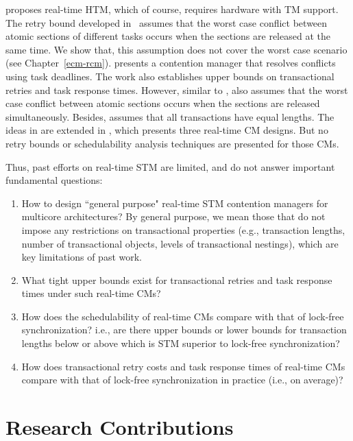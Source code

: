 \cite{schoeberl2010rttm} proposes real-time HTM, which of course, requires hardware with TM support. The retry bound developed in~\cite{schoeberl2010rttm} assumes that the worst case conflict between atomic sections of different tasks occurs when the sections are released at the same time. We show that, this assumption does not cover the worst case scenario (see Chapter~\ref{ecm-rcm}). \cite{6045438} presents a contention manager that resolves conflicts using task deadlines. The work also establishes upper bounds on transactional retries and task response times. However, similar to \cite{schoeberl2010rttm}, \cite{6045438} also assumes that the worst case conflict between atomic sections occurs when the sections are released simultaneously. Besides, \cite{6045438} assumes that all transactions have equal lengths. The ideas in \cite{6045438} are extended in \cite{barrosmanaging}, which presents three real-time CM designs. But no retry bounds or schedulability analysis techniques are presented for those CMs.

Thus, past efforts on real-time STM are limited, and do not answer important fundamental questions:
\begin{enumerate}[(1)]
\item How to design ``general purpose" real-time STM contention managers for multicore architectures? By general purpose, we mean those that do not impose any restrictions on transactional properties (e.g., transaction lengths, number of transactional objects, levels of transactional nestings), which are key limitations of past work. 
\item What tight upper bounds exist for transactional retries and task response times under such real-time CMs?
\item How does the schedulability of real-time CMs compare with that of lock-free synchronization? i.e., are there upper bounds or lower bounds for transaction lengths below or above which is STM superior to lock-free synchronization?
\item How does transactional retry costs and task response times of real-time CMs compare with that of lock-free synchronization in practice (i.e., on average)?
\end{enumerate}

\section{Research Contributions}

